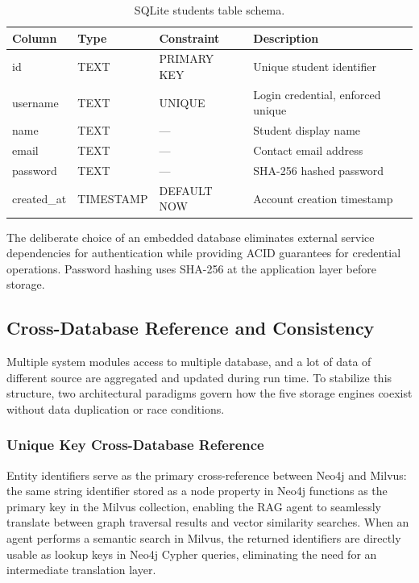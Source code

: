 \begin{table}[H]
\centering
\caption{SQLite students table schema.}
\label{tab:sqlite_schema}
\renewcommand{\arraystretch}{1.2}
\begin{tabularx}{\textwidth}{|l|l|l|X|}
\hline
\textbf{Column} &\textbf{Type}  & \textbf{Constraint} & \textbf{Description} \\ \hline
id & TEXT & PRIMARY KEY & Unique student identifier \\ \hline
username & TEXT & UNIQUE & Login credential, enforced unique \\ \hline
name & TEXT & --- & Student display name \\ \hline
email & TEXT & --- & Contact email address \\ \hline
password & TEXT & --- & SHA-256 hashed password \\ \hline
created\_at & TIMESTAMP & DEFAULT NOW & Account creation timestamp \\ \hline
\end{tabularx}
\end{table}

The deliberate choice of an embedded database eliminates external service dependencies for authentication while providing ACID guarantees for credential operations. Password hashing uses SHA-256 at the application layer before storage.

\subsection{Cross-Database Reference and Consistency}
Multiple system modules access to multiple database, and a lot of data of different source are aggregated and updated during run time.
To stabilize this structure, two architectural paradigms govern how the five storage engines coexist without data duplication or race conditions.

\subsubsection*{Unique Key Cross-Database Reference}

Entity identifiers serve as the primary cross-reference between Neo4j and Milvus: the same string identifier stored as a node 
property in Neo4j functions as the primary key in the Milvus collection, enabling the RAG agent to seamlessly translate between 
graph traversal results and vector similarity searches. When an agent performs a semantic search in Milvus, the returned identifiers are directly usable as lookup keys in Neo4j Cypher queries, eliminating the need for an intermediate translation layer.


